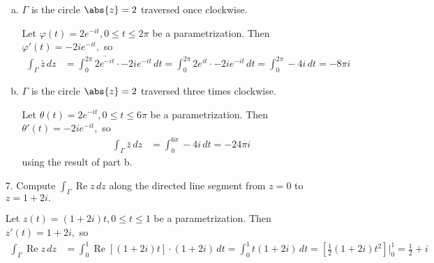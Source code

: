 \documentclass{article}
\DeclareMathOperator{\re}{Re}
\begin{document}
\begin{itemize}
\begin{enumerate}[(a)]
			\item $\Gamma$ is the circle $\abs{z}=2$ traversed once clockwise.
				\begin{soln}
					Let $\varphi(t)=2e^{-it}, 0\le t\le 2\pi$ be a parametrization. Then $\varphi'(t)=-2ie^{-it},$ so
					\begin{align*}
						\int_{\Gamma} \bar z\, dz &= \int_0^{2\pi} \overline{ 2e^{-it}}\cdot -2ie^{-it}\, dt = \int_0^{2\pi} 2e^{it}\cdot -2ie^{-it}\, dt = \int_0^{2\pi} -4i\, dt = -8\pi i
					\end{align*}
				\end{soln}

			\item $\Gamma$ is the circle $\abs{z}=2$ traversed three times clockwise. 
				\begin{soln}
					Let $\theta(t)=2e^{-it}, 0\le t\le 6\pi$ be a parametrization. Then $\theta'(t)=-2ie^{-it},$ so
					\begin{align*}
						\int_\Gamma\bar z\, dz &= \int_0^{6\pi} -4i\, dt = -24\pi i
					\end{align*}
					using the result of part b.
				\end{soln}

		\end{enumerate}

	\item[7.] Compute $\int_\Gamma \re z\, dz$ along the directed line segment from $z=0$ to $z=1+2i.$
		\begin{soln}
			Let $z(t)=(1+2i)t, 0\le t\le 1$ be a parametrization. Then $z'(t)=1+2i,$ so
			\begin{align*}
				\int_\Gamma\re z\, dz &= \int_0^{1} \re\left[ (1+2i)t \right]\cdot (1+2i)\, dt = \int_0^1 t(1+2i)\, dt = \left[ \frac{1}{2}(1+2i)t^2 \right]\bigg|_0^1 = \frac{1}{2} + i
			\end{align*}
		\end{soln}


\end{itemize}
\end{document}
